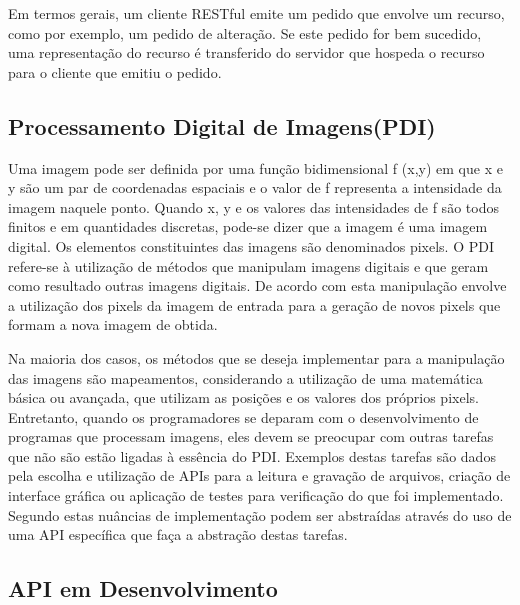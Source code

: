 \documentclass[12pt]{article}
\begin{document}
Em termos gerais, um cliente RESTful emite um pedido que envolve um recurso, como
por exemplo, um pedido de alteração. Se este pedido for bem sucedido, uma representação
do recurso é transferido do servidor que hospeda o recurso para o cliente que emitiu o
pedido.


\subsection{Processamento Digital de Imagens(PDI)}

Uma imagem pode ser definida por uma função bidimensional f (x,y) em que x e y são um par de coordenadas espaciais e o valor de f representa a intensidade da
imagem naquele ponto. Quando x, y e os valores das intensidades de f são todos finitos e em quantidades discretas, pode-se dizer que a imagem é uma imagem
digital. Os elementos constituintes das imagens são denominados pixels. O PDI refere-se à utilização de métodos que manipulam imagens digitais e que geram
como resultado outras imagens digitais. De acordo com \cite{gonzalez:08} esta manipulação envolve a utilização dos pixels da imagem de entrada para a geração de novos pixels que formam a
nova imagem de obtida.

Na maioria dos casos, os métodos que se deseja implementar para a manipulação das imagens são mapeamentos, considerando a utilização de uma matemática
básica ou avançada, que utilizam as posições e os valores dos próprios pixels. Entretanto, quando os programadores se deparam com o desenvolvimento de
programas que processam imagens, eles devem se preocupar com outras tarefas que não são estão ligadas à essência do PDI. Exemplos destas tarefas são dados
pela escolha e utilização de APIs para a leitura e gravação de arquivos, criação de interface gráfica ou aplicação de testes para verificação do que foi
implementado. Segundo \cite{gonzalez:08,jain:89} estas nuâncias de implementação podem ser abstraídas através do uso de uma API específica que faça a abstração destas tarefas.

\subsection{API em Desenvolvimento}
\end{document}
